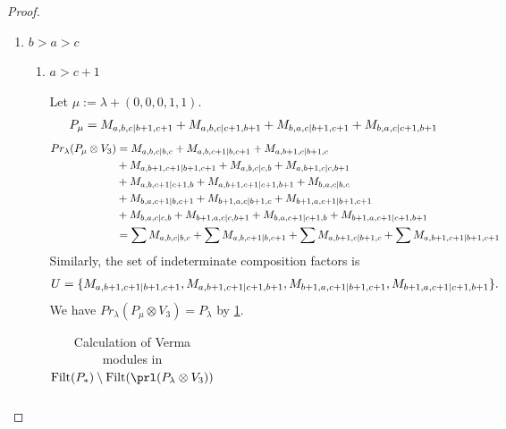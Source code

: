 \begin{proof}
\begin{enumerate}
  \item $b>a>c$
    \begin{enumerate}
      \item $a>c+1$ \par
         Let $\mu:=\lambda + (0,0,0,1,1) $.
        \begin{equation}\notag
          \begin{aligned}
            P_\mu = M_{a,b,c|b+1,c+1}
+M_{a,b,c|c+1,b+1}
+M_{b,a,c|b+1,c+1}
+M_{b,a,c|c+1,b+1}
          \end{aligned}
        \end{equation}
        \begin{equation}\notag
          \begin{aligned}
            Pr_{\lambda}(P_\mu \otimes V_{3}) &=
M_{a,b,c|b,c}
+ M_{a,b,c+1|b,c+1}
+ M_{a,b+1,c|b+1,c}\\
                                            &
+ M_{a,b+1,c+1|b+1,c+1}
+ M_{a,b,c|c,b}
+ M_{a,b+1,c|c,b+1}\\
                                            &
+ M_{a,b,c+1|c+1,b}
+ M_{a,b+1,c+1|c+1,b+1}
+ M_{b,a,c|b,c}\\
                                            &
+ M_{b,a,c+1|b,c+1}
+ M_{b+1,a,c|b+1,c}
+ M_{b+1,a,c+1|b+1,c+1}\\
                                            &
+ M_{b,a,c|c,b}
+ M_{b+1,a,c|c,b+1}
+ M_{b,a,c+1|c+1,b}
+ M_{b+1,a,c+1|c+1,b+1} \\
                                               &=
\sum M_{a,b,c|b,c}
+ \sum M_{a,b,c+1|b,c+1}
+ \sum M_{a,b+1,c|b+1,c}
+ \sum M_{a,b+1,c+1|b+1,c+1}
          \end{aligned}
        \end{equation}
      Similarly, the set of indeterminate composition factors is 
\begin{equation}\notag
  \begin{aligned}
    U = \{
M_{a,b+1,c+1|b+1,c+1},
M_{a,b+1,c+1|c+1,b+1},
M_{b+1,a,c+1|b+1,c+1},
M_{b+1,a,c+1|c+1,b+1}
\}.
  \end{aligned}
\end{equation}
       We have $Pr_{\lambda}(P_\mu \otimes V_{3}) = P_\lambda  $ by \cref{tab:verma-analysis_7}.
\begin{table}[htbp]
\centering
\caption{Calculation of Verma modules in $\operatorname{Filt}(P_*) \setminus \operatorname{Filt}(\prl(P_\lambda \otimes V_{3})) $ } \label{tab:verma-analysis_7}
\begin{tabular}{cc}
\toprule

\end{tabular}
\end{table}
\end{enumerate}
\end{enumerate}
\end{proof}
